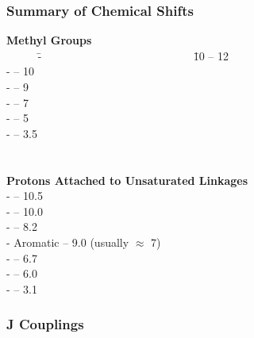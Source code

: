 \subsubsection{Summary of Chemical Shifts}

\begin{tabbing}
\textbf{Methyl Groups}\\

  ~~~~~ \= -  ~~~~~~~~~~~~~~~~~~~~~~~~~~  \= 10 -- 12 \\
  \> -                              -- 10 \\
  \> -                               -- 9 \\
  \> -                             -- 7 \\
  \> -                              -- 5 \\
  \> -                                -- 3.5 \\\\\\

\textbf{Protons Attached to Unsaturated Linkages}\\
  \> -                                -- 10.5 \\
  \> -                                  -- 10.0 \\
  \> -                                -- 8.2 \\
  \> - Aromatic                                  -- 9.0 (usually $\approx$ 7)\\
  \> -                               -- 6.7 \\
  \> -                                  -- 6.0 \\
  \> -                                 -- 3.1 \\
\end{tabbing}


\pagebreak

\subsubsection{J Couplings}

